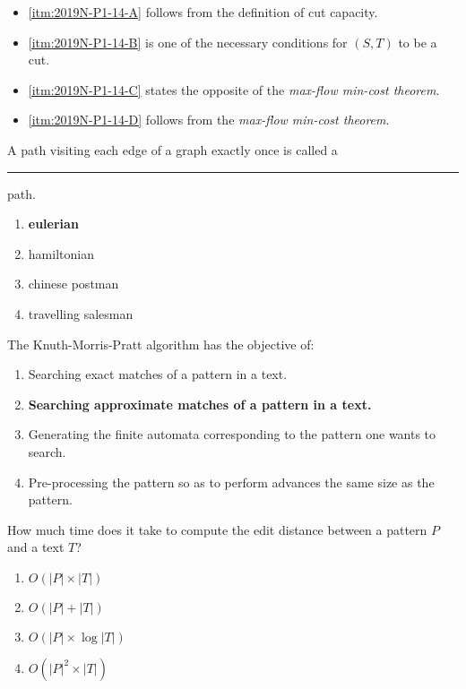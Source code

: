 {\ansseparator

\newpage
\begin{itemize}
    \item[] \ref{itm:2019N-P1-14-A} follows from the definition of cut capacity.
    \item[] \ref{itm:2019N-P1-14-B} is one of the necessary conditions for $(S,T)$ to be a cut.
    \item[] \ref{itm:2019N-P1-14-C} states the opposite of the \emph{max-flow min-cost theorem}.
    \item[] \ref{itm:2019N-P1-14-D} follows from the \emph{max-flow min-cost theorem}.  
\end{itemize}

A path visiting each edge of a graph exactly once is called a \rule{2.5cm}{0.15mm} path.
\begin{enumerate}[label=\Alph*)]\itemsep0em
    \item \textbf{eulerian \greencheckmark}
    \item hamiltonian
    \item chinese postman
    \item travelling salesman
\end{enumerate}

The Knuth-Morris-Pratt algorithm has the objective of:
\begin{enumerate}[label=\Alph*)]\itemsep0em
    \item Searching exact matches of a pattern in a text.
    \item \textbf{Searching approximate matches of a pattern in a text. \greencheckmark}
    \item Generating the finite automata corresponding to the pattern one wants to search.
    \item Pre-processing the pattern so as to perform advances the same size as the pattern.
\end{enumerate}

How much time does it take to compute the edit distance between a pattern $P$ and a text $T$?
\begin{enumerate}[label=\Alph*)]\itemsep0em
    \item $O(|P| \times |T|)$ \greencheckmark
    \item $O(|P| + |T|)$
    \item $O(|P| \times \log |T|)$
    \item $O(|P|^2 \times |T|)$
\end{enumerate}

}
